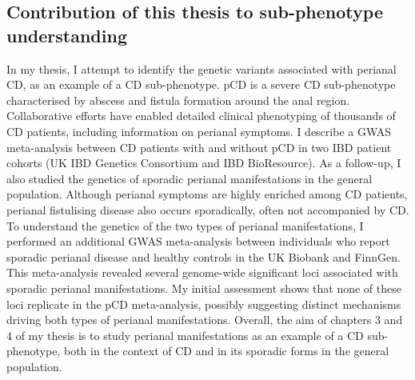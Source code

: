 \subsection{Contribution of this thesis to sub-phenotype understanding}
In my thesis, I attempt to identify the genetic variants associated with perianal CD, as an example of a CD sub-phenotype. pCD is a severe CD sub-phenotype characterised by abscess and fistula formation around the anal region. Collaborative efforts have enabled detailed clinical phenotyping of thousands of CD patients, including information on perianal symptoms. I describe a GWAS meta-analysis between CD patients with and without pCD in two IBD patient cohorts (UK IBD Genetics Consortium and IBD BioResource). As a follow-up, I also studied the genetics of sporadic perianal manifestations in the general population. Although perianal symptoms are highly enriched among CD patients, perianal fistulising disease also occurs sporadically, often not accompanied by CD. To understand the genetics of the two types of perianal manifestations, I performed an additional GWAS meta-analysis between individuals who report sporadic perianal disease and healthy controls in the UK Biobank and FinnGen. This meta-analysis revealed several genome-wide significant loci associated with sporadic perianal manifestations. My initial assessment shows that none of these loci replicate in the pCD meta-analysis, possibly suggesting distinct mechanisms driving both types of perianal manifestations. Overall, the aim of chapters 3 and 4 of my thesis is to study perianal manifestations as an example of a CD sub-phenotype, both in the context of CD and in its sporadic forms in the general population. 









